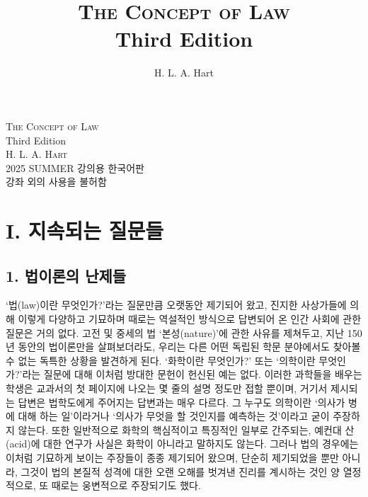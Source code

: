 \documentclass[12pt, oneside]{book}  %
\title{\Huge\textsc{The Concept of Law} \\[2ex] \Large Third Edition}
\author{\Large H. L. A. Hart}
\date{}
\begin{document}
\begin{titlepage}
  \centering
  \vspace*{3cm}
  {\Huge\textsc{The Concept of Law}}\\[1.5ex]
  {\Large Third Edition}\\[4ex]
  \textsc{H. L. A. Hart}\\[6ex]
  {\small 2025 SUMMER 강의용 한국어판\\
  강좌 외의 사용을 불허함}
  \vfill
\end{titlepage}

\section{\texorpdfstring{\textbf{I. 지속되는
질문들}}{I. 지속되는 질문들}}\label{i.-uxc9c0uxc18duxb418uxb294-uxc9c8uxbb38uxb4e4}

\subsection{\texorpdfstring{\textbf{1. 법이론의
난제들}}{1. 법이론의 난제들}}\label{uxbc95uxc774uxb860uxc758-uxb09cuxc81cuxb4e4}

`법(law)이란 무엇인가?'라는 질문만큼 오랫동안 제기되어 왔고, 진지한
사상가들에 의해 이렇게 다양하고 기묘하며 때로는 역설적인 방식으로
답변되어 온 인간 사회에 관한 질문은 거의 없다. 고전 및 중세의 법
`본성(nature)'에 관한 사유를 제쳐두고, 지난 150년 동안의 법이론만을
살펴보더라도, 우리는 다른 어떤 독립된 학문 분야에서도 찾아볼 수 없는
독특한 상황을 발견하게 된다. `화학이란 무엇인가?' 또는 `의학이란
무엇인가?'라는 질문에 대해 이처럼 방대한 문헌이 헌신된 예는 없다. 이러한
과학들을 배우는 학생은 교과서의 첫 페이지에 나오는 몇 줄의 설명 정도만
접할 뿐이며, 거기서 제시되는 답변은 법학도에게 주어지는 답변과는 매우
다르다. 그 누구도 의학이란 `의사가 병에 대해 하는 일'이라거나 `의사가
무엇을 할 것인지를 예측하는 것'이라고 굳이 주장하지 않는다. 또한
일반적으로 화학의 핵심적이고 특징적인 일부로 간주되는, 예컨대 산(acid)에
대한 연구가 사실은 화학이 아니라고 말하지도 않는다. 그러나 법의 경우에는
이처럼 기묘하게 보이는 주장들이 종종 제기되어 왔으며, 단순히 제기되었을
뿐만 아니라, 그것이 법의 본질적 성격에 대한 오랜 오해를 벗겨낸 진리를
계시하는 것인 양 열정적으로, 또 때로는 웅변적으로 주장되기도 했다.
\end{document}
